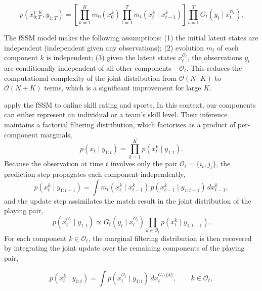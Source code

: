 \begin{equation}
p(x_{0:T}^{1:K}, y_{1:T}) = \left[ \prod_{k=1}^K m_0(x_0^k) \prod_{t=1}^T m_t(x_t^k \mid x_{t-1}^k) \right] \prod_{t=1}^T G_t(y_t \mid x_t^{\mathcal{O}_t}).
\end{equation}

The fSSM model makes the following assumptions: (1) the initial latent states are  independent (independent given any observations); (2) evolution $m_t$ of each component $k$ is independent; (3) given the latent states $x_t^{\mathcal{O}_t}$, the observations $y_t$ are conditionally independent of all other components $-\mathcal{O}_t$. This reduces the computational complexity of the joint distribution from $\mathcal{O}(N \cdot K)$ to $\mathcal{O}(N + K)$ terms, which is a significant improvement for large $K$.

\citet{duffieldpowerrimella2024factorialssm} apply the fSSM to online skill rating and sports. In this context, our components can either represent an individual or a team's skill level. Their inference maintains a factorial filtering distribution, which factorises as a product of per-component marginals,
\begin{equation}
\label{eq:factorial-filter}
p(x_t \mid y_{1:t}) = \prod_{k=1}^K p(x_t^k \mid y_{1:t}).
\end{equation}
Because the observation at time $t$ involves only the pair $\mathcal{O}_t = \{i_t, j_t\}$, the prediction step propagates each component independently,
\begin{equation}
p(x_t^k \mid y_{1:t-1}) = \int m_t(x_t^k \mid x_{t-1}^k) \, p(x_{t-1}^k \mid y_{1:t-1}) \, dx_{t-1}^k,
\end{equation}
and the update step assimilates the match result in the joint distribution of the playing pair,
\begin{equation}
p(x_t^{\mathcal{O}_t} \mid y_{1:t}) \propto G_t(y_t \mid x_t^{\mathcal{O}_t}) \prod_{k \in \mathcal{O}_t} p(x_t^k \mid y_{1:t-1}).
\end{equation}
For each component $k \in \mathcal{O}_t$, the marginal filtering distribution is then recovered by integrating the joint update over the remaining components of the playing pair,

\begin{equation}
p(x_t^k \mid y_{1:t}) = \int p(x_t^{\mathcal{O}_t} \mid y_{1:t}) \, dx_t^{\mathcal{O}_t \setminus \{k\}}, \qquad k \in \mathcal{O}_t,
\end{equation}

